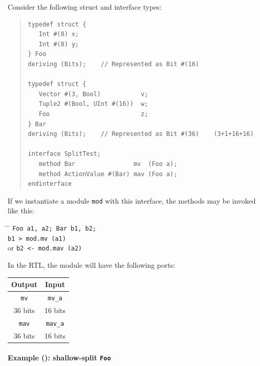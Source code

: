 \label{sec:splitports_examples_BSV_baseline}

\hspace*{1em}

Consider the following struct and interface types:
\begin{quote}
\begin{verbatim}
typedef struct {
   Int #(8) x;
   Int #(8) y;
} Foo
deriving (Bits);    // Represented as Bit #(16)

typedef struct {
   Vector #(3, Bool)           v;
   Tuple2 #(Bool, UInt #(16))  w;
   Foo                         z;
} Bar
deriving (Bits);    // Represented as Bit #(36)    (3+1+16+16)

interface SplitTest;
   method Bar                mv  (Foo a);
   method ActionValue #(Bar) mav (Foo a);
endinterface
\end{verbatim}
\end{quote}

If we instantiate a module {\tt mod} with this interface, the methods
may be invoked like this:

\begin{tabbing}
\hspace*{4em} \= \hspace*{2em} \= \kill
\hspace*{4em} \>               \> {\tt Foo a1, a2; Bar b1, b2;} \\
              \>               \> {\tt b1  > mod.mv  (a1)} \\
              \>  or           \> {\tt b2 <- mod.mav (a2)}
\end{tabbing}

In the RTL, the module will have the following ports:

\begin{center}
  \begin{tabular}{|c||c|}
    \hline
     Output &
     Input  \\
    \hline
     {\tt mv}    &
     {\tt mv\_a} \\
     36 bits &
     16 bits \\
    \hline
     {\tt mav}    &
     {\tt mav\_a} \\
     36 bits &
     16 bits \\
    \hline
\end{tabular}
\end{center}


\paragraph{Example (\BSV): shallow-split {\tt Foo}}

